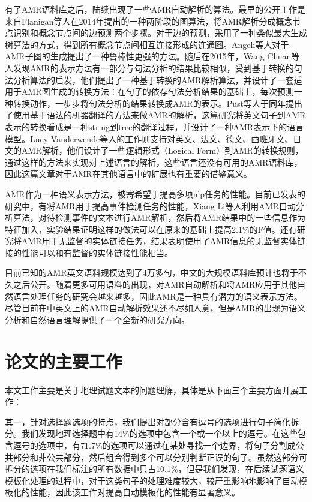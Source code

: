 \documentclass[master, winfont]{njuthesis}
\begin{document}
有了AMR语料库之后，陆续出现了一些AMR自动解析的算法。最早的公开工作是来自Flanigan等人\cite{Flanigan2014}在2014年提出的一种两阶段的图算法，将AMR解析分成概念节点识别和概念节点间的边预测两个步骤。对于边的预测，采用了一种类似最大生成树算法的方式，得到所有概念节点间相互连接形成的连通图。Angeli等人\cite{Angeli2014}对于AMR子图的生成提出了一种鲁棒性更强的方法。随后在2015年，Wang Chuan\cite{Wang2015}等人发现AMR的表示方法有一部分与句法分析的结果比较相似，受到基于转换的句法分析算法的启发，他们提出了一种基于转换的AMR解析算法，并设计了一套适用于AMR图生成的转换方法：在句子的依存句法分析结果的基础上，每次预测一种转换动作，一步步将句法分析的结果转换成AMR的表示。Pust等人\cite{Pust2015}于同年提出了使用基于语法的机器翻译的方法来做AMR的解析，这篇研究将英文句子到AMR表示的转换看成是一种string到tree的翻译过程，并设计了一种AMR表示下的语言模型。Lucy Vanderwende等人\cite{Vanderwende2015}的工作则支持对英文、法文、德文、西班牙文、日文的AMR解析，他们设计了一些逻辑形式（Logical Form）到AMR的转换规则，通过这样的方法来实现对上述语言的解析，这些语言还没有可用的AMR语料库，因此这篇文章对于AMR在其他语言中的扩展也有重要的借鉴意义。

AMR作为一种语义表示方法，被寄希望于提高多项nlp任务的性能。目前已发表的研究中，有将AMR用于提高事件检测任务的性能\cite{kai2015improving}，Xiang Li等人利用AMR自动分析算法，对待检测事件的文本进行AMR解析，然后将AMR结果中的一些信息作为特征加入，实验结果证明这样的做法可以在原来的基础上提高2.1\%的F值。还有研究将AMR用于无监督的实体链接任务\cite{Pan2015}，结果表明使用了AMR信息的无监督实体链接的性能可以和有监督的实体链接性能相当。

目前已知的AMR英文语料规模达到了4万多句，中文的大规模语料库预计也将于不久之后公开。随着更多可用语料的出现，对AMR自动解析和将AMR应用于其他自然语言处理任务的研究会越来越多，因此AMR是一种具有潜力的语义表示方法。尽管目前在中英文上的AMR自动解析效果还不尽如人意，但是AMR的出现为语义分析和自然语言理解提供了一个全新的研究方向。

\section{论文的主要工作}
本文工作主要是关于地理试题文本的问题理解，具体是从下面三个主要方面开展工作：

其一，针对选择题选项的特点，我们提出对部分含有逗号的选项进行句子简化拆分。我们发现地理选择题中有14\%的选项中包含一个或一个以上的逗号。在这些包含逗号的选项中，有71.7\%的选项可以通过在某处寻找一个边界，将句子分割成公共部分和非公共部分，然后组合得到多个可以分别判断正误的句子。虽然这部分可拆分的选项在我们标注的所有数据中只占10.1\%，但是我们发现，在后续试题语义模板化处理的过程中，对于这类句子的处理难度较大，较严重影响地影响了自动模板化的性能，因此该工作对提高自动模板化的性能有显著意义。
\end{document}
